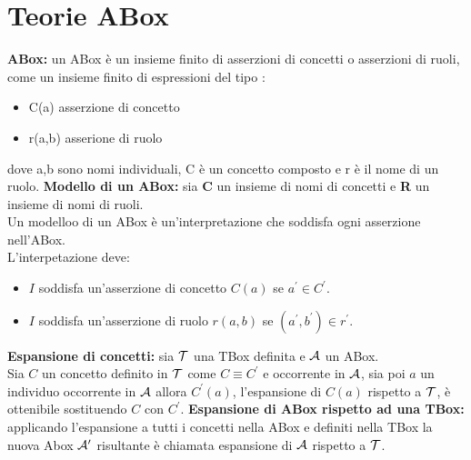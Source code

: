 \documentclass[../main.tex]{subfiles}
\begin{document}
   \section{Teorie ABox}
   \textbf{ABox:} un ABox è un insieme finito di asserzioni di concetti o asserzioni di ruoli, come un insieme finito di espressioni del tipo :
   \begin{itemize}
      \item C(a) asserzione di concetto
      \item r(a,b) asserione di ruolo
   \end{itemize} 
   dove a,b sono nomi individuali, C è un concetto composto e r è il nome di un ruolo.
   \spazio
   \textbf{Modello di un ABox:} sia \textbf{C} un insieme di nomi di concetti e \textbf{R} un insieme di nomi di ruoli.\\
   Un modelloo di un ABox è un'interpretazione che soddisfa ogni asserzione nell'ABox.\\
   L'interpetazione deve:
   \begin{itemize}
      \item $I$ soddisfa un'asserzione di concetto $C(a)$ se $a^\prime \in C^\prime$.
      \item $I$ soddisfa un'asserzione di ruolo $r(a,b)$ se $(a^\prime, b^\prime) \in r^\prime$. 
   \end{itemize}
   \vspace{2em}
   \textbf{Espansione di concetti:} sia $\mathcal{T}$ una TBox definita e $\mathcal{A}$ un ABox.\\
   Sia $C$ un concetto definito in $\mathcal{T}$ come $C \equiv C^\prime$ e occorrente in $\mathcal{A}$, sia poi $a$ un individuo occorrente in $\mathcal{A}$ allora $C^\prime (a)$, l'espansione di $C(a)$ rispetto a $\mathcal{T}$, è ottenibile sostituendo $C$ con $C^\prime$.
   \spazio
   \textbf{Espansione di ABox rispetto ad una TBox:} applicando l'espansione a tutti i concetti nella ABox e definiti nella TBox la nuova Abox $\mathcal{A}^\prime$ risultante è chiamata espansione di $\mathcal{A}$ rispetto a $\mathcal{T}$.
\end{document}
